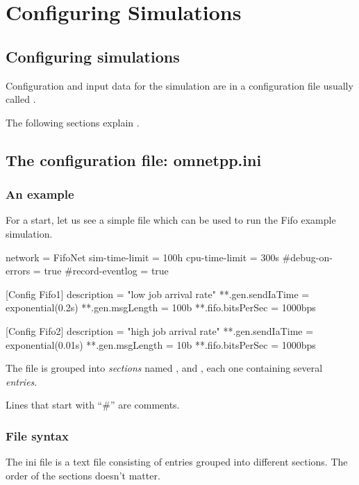 \chapter{Configuring Simulations}
\label{cha:config-sim}

\section{Configuring simulations}

Configuration and input data for the simulation are in
a configuration file usually called .

The following sections explain .

\section{The configuration file: omnetpp.ini}

\subsection{An example}

For a start, let us see a simple  file which
can be used to run the Fifo example simulation.

\begin{inifile}
[General]
network = FifoNet
sim-time-limit = 100h
cpu-time-limit = 300s
#debug-on-errors = true
#record-eventlog = true

[Config Fifo1]
description = "low job arrival rate"
**.gen.sendIaTime = exponential(0.2s)
**.gen.msgLength = 100b
**.fifo.bitsPerSec = 1000bps

[Config Fifo2]
description = "high job arrival rate"
**.gen.sendIaTime = exponential(0.01s)
**.gen.msgLength = 10b
**.fifo.bitsPerSec = 1000bps
\end{inifile}

The file is grouped into \textit{sections} named \ttt{[General]}, 
and , each one containing several \textit{entries}.

Lines that start with ``\#'' are comments.


\subsection{File syntax}

The ini file is a text file consisting of entries grouped into different sections.
The order of the sections doesn't matter.

